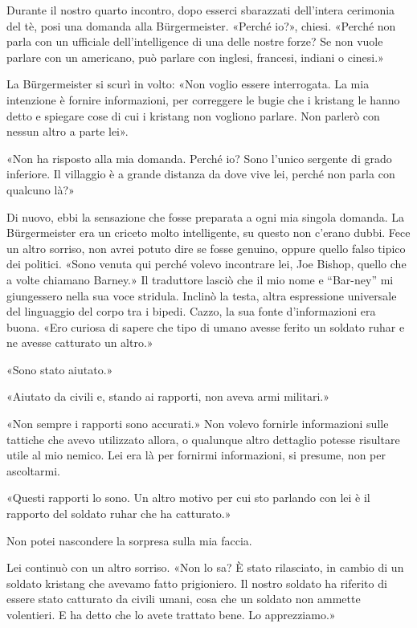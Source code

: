 Durante il nostro quarto incontro, dopo esserci sbarazzati dell'intera
cerimonia del tè, posi una domanda alla Bürgermeister. «Perché io?»,
chiesi. «Perché non parla con un ufficiale dell'intelligence di una
delle nostre forze? Se non vuole parlare con un americano, può parlare
con inglesi, francesi, indiani o cinesi.»

La Bürgermeister si scurì in volto: «Non voglio essere interrogata. La
mia intenzione è fornire informazioni, per correggere le bugie che i
kristang le hanno detto e spiegare cose di cui i kristang non vogliono
parlare. Non parlerò con nessun altro a parte lei».

«Non ha risposto alla mia domanda. Perché io? Sono l'unico sergente di
grado inferiore. Il villaggio è a grande distanza da dove vive lei,
perché non parla con qualcuno là?»

Di nuovo, ebbi la sensazione che fosse preparata a ogni mia singola
domanda. La Bürgermeister era un criceto molto intelligente, su questo
non c'erano dubbi. Fece un altro sorriso, non avrei potuto dire se fosse
genuino, oppure quello falso tipico dei politici. «Sono venuta qui
perché volevo incontrare lei, Joe Bishop, quello che a volte chiamano
Barney.» Il traduttore lasciò che il mio nome e ``Bar-ney'' mi
giungessero nella sua voce stridula. Inclinò la testa, altra espressione
universale del linguaggio del corpo tra i bipedi. Cazzo, la sua fonte
d'informazioni era buona. «Ero curiosa di sapere che tipo di umano
avesse ferito un soldato ruhar e ne avesse catturato un altro.»

«Sono stato aiutato.»

«Aiutato da civili e, stando ai rapporti, non aveva armi militari.»

«Non sempre i rapporti sono accurati.» Non volevo fornirle informazioni
sulle tattiche che avevo utilizzato allora, o qualunque altro dettaglio
potesse risultare utile al mio nemico. Lei era là per fornirmi
informazioni, si presume, non per ascoltarmi.

«Questi rapporti lo sono. Un altro motivo per cui sto parlando con lei è
il rapporto del soldato ruhar che ha catturato.»

Non potei nascondere la sorpresa sulla mia faccia.

Lei continuò con un altro sorriso. «Non lo sa? È stato rilasciato, in
cambio di un soldato kristang che avevamo fatto prigioniero. Il nostro
soldato ha riferito di essere stato catturato da civili umani, cosa che
un soldato non ammette volentieri. E ha detto che lo avete trattato
bene. Lo apprezziamo.»

